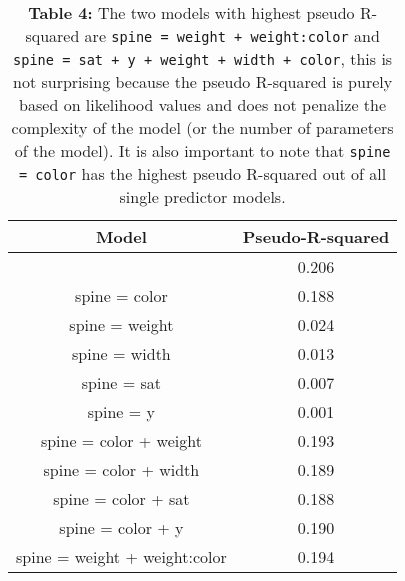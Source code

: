 \documentclass[a4paper, 12pt]{article}
\begin{document}
\begin{table}[H]
  \centering
    \begin{tabular}{|c|c|}
    \toprule
    \multicolumn{1}{|p{13.28em}|}{Model} & \multicolumn{1}{p{9.72em}|}{Pseudo-R-squared} \\
    \midrule
    \rowcolor[rgb]{ 1,  .922,  .612} \multicolumn{1}{|p{13.28em}|}{\textcolor[rgb]{ .612,  .341,  0}{spine = sat + y + weight + width + color }} & \textcolor[rgb]{ .612,  .341,  0}{0.206} \\
    spine = color  & 0.188 \\
    spine = weight  & 0.024 \\
    spine = width  & 0.013 \\
    spine = sat  & 0.007 \\
    spine = y  & 0.001 \\
    \multicolumn{1}{|p{13.28em}|}{spine = color + weight} & 0.193 \\
    spine = color + width & 0.189 \\
    spine = color + sat  & 0.188 \\
    spine = color + y & 0.190 \\
    \rowcolor[rgb]{ 1,  .922,  .612} \textcolor[rgb]{ .612,  .341,  0}{spine = weight + weight:color} & \textcolor[rgb]{ .612,  .341,  0}{0.194} \\
    \bottomrule
    \end{tabular}%
     \caption*{\textbf{Table 4:} The two models with highest pseudo R-squared are \texttt{spine = weight + weight:color} and \texttt{spine = sat + y + weight + width + color}, this is not surprising because the pseudo R-squared is purely based on likelihood values and does not penalize the complexity of the model (or the number of parameters of the model). It is also important to note that \texttt{spine = color} has the highest pseudo R-squared out of all single predictor models. }
\end{table}%
\end{document}
